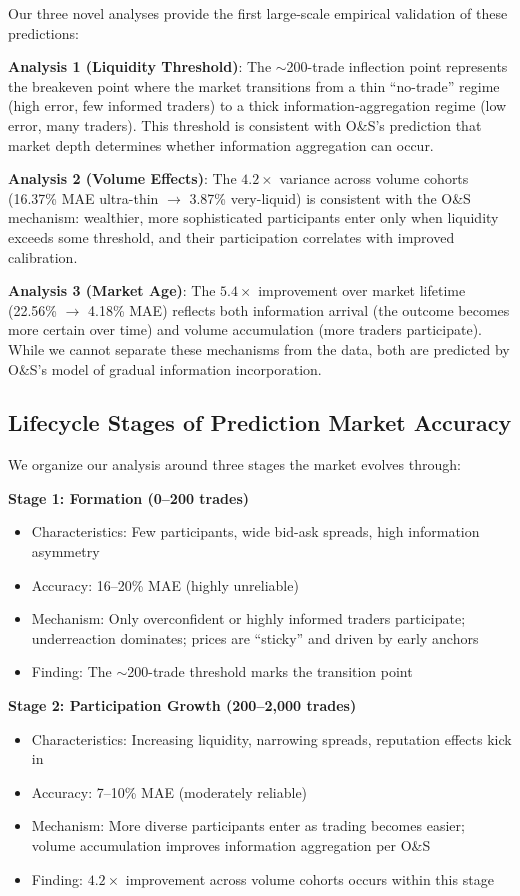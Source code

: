 \documentclass[a4paper,11pt]{article}
\theoremstyle{plain}
\theoremstyle{definition}
\begin{document}
Our three novel analyses provide the first large-scale empirical validation of these predictions:

\textbf{Analysis 1 (Liquidity Threshold)}: The $\sim$200-trade inflection point represents the breakeven point where the market transitions from a thin ``no-trade'' regime (high error, few informed traders) to a thick information-aggregation regime (low error, many traders). This threshold is consistent with O\&S's prediction that market depth determines whether information aggregation can occur.

\textbf{Analysis 2 (Volume Effects)}: The $4.2\times$ variance across volume cohorts (16.37\% MAE ultra-thin $\to$ 3.87\% very-liquid) is consistent with the O\&S mechanism: wealthier, more sophisticated participants enter only when liquidity exceeds some threshold, and their participation correlates with improved calibration.

\textbf{Analysis 3 (Market Age)}: The $5.4\times$ improvement over market lifetime (22.56\% $\to$ 4.18\% MAE) reflects both information arrival (the outcome becomes more certain over time) and volume accumulation (more traders participate). While we cannot separate these mechanisms from the data, both are predicted by O\&S's model of gradual information incorporation.

\subsection{Lifecycle Stages of Prediction Market Accuracy}

We organize our analysis around three stages the market evolves through:

\textbf{Stage 1: Formation (0--200 trades)}
\begin{itemize}
\item Characteristics: Few participants, wide bid-ask spreads, high information asymmetry
\item Accuracy: 16--20\% MAE (highly unreliable)
\item Mechanism: Only overconfident or highly informed traders participate; underreaction dominates; prices are ``sticky'' and driven by early anchors
\item Finding: The $\sim$200-trade threshold marks the transition point
\end{itemize}

\textbf{Stage 2: Participation Growth (200--2,000 trades)}
\begin{itemize}
\item Characteristics: Increasing liquidity, narrowing spreads, reputation effects kick in
\item Accuracy: 7--10\% MAE (moderately reliable)
\item Mechanism: More diverse participants enter as trading becomes easier; volume accumulation improves information aggregation per O\&S
\item Finding: $4.2\times$ improvement across volume cohorts occurs within this stage
\end{itemize}
\end{document}
